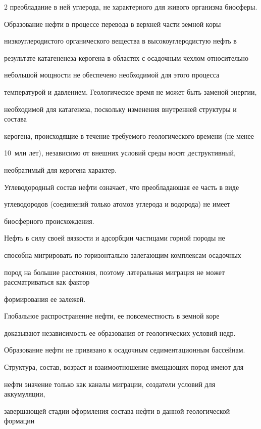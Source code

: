 \begin{multicols}{2}
преобладание в ней углерода, не характерного для живого организма биосферы. 

     Образование нефти в процессе перевода в верхней части земной коры 

низкоуглеродистого органического вещества в высокоуглеродистую нефть в 

результате катагененеза керогена в об\-ластях с осадочным чехлом относительно 

небольшой мощности не обеспечено необходимой для этого процесса 

температурой и давлением. Геологическое время не может быть заменой энергии, 

необходимой для катагенеза, поскольку изменения внутренней структуры и состава 

керогена, происходящие в течение требуемого геологического времени (не менее 

10~млн лет), независимо от внешних условий среды носят деструктивный, 

необратимый для керогена характер. 

     

     Углеводородный состав нефти означает, что преобладающая ее часть в виде 

углеводородов (соединений только атомов углерода и водорода) не имеет 

биосферного происхождения.

     

     Нефть в силу своей вязкости и адсорбции час\-ти\-ца\-ми горной породы не 

способна мигрировать по горизонтально залегающим комплексам осадочных 

пород на большие расстояния, поэтому латеральная миграция не может рассматриваться как фактор 

формирования ее залежей.

     

     Глобальное распространение нефти, ее повсеместность в земной коре 

доказывают независимость ее образования от геологических условий недр. 

Образование нефти не привязано к осадочным седиментационным бассейнам. 

Структура, состав, возраст и взаимоотношение вме\-ща\-ющих пород имеют для 

нефти значение только как каналы миграции, создатели условий для аккумуляции, 

завершающей стадии оформления состава нефти в данной геологической формации 


\end{multicols}
